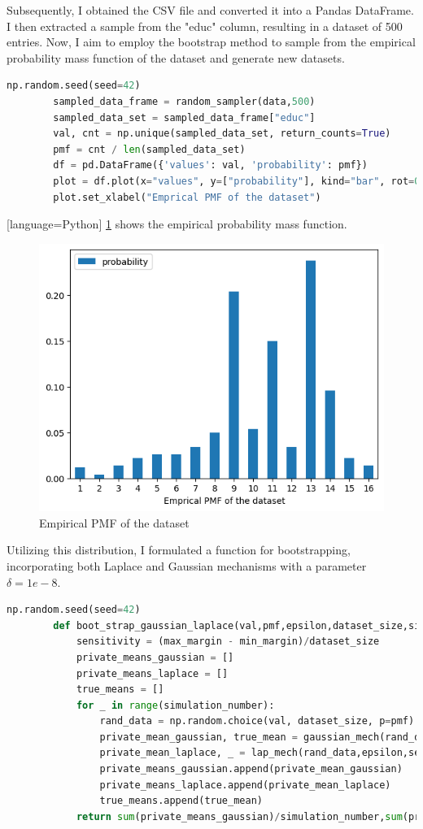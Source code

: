 \documentclass[12pt]{extarticle}
\begin{document}
	Subsequently, I obtained the CSV file and converted it into a Pandas DataFrame. I then extracted a sample from the "educ" column, resulting in a dataset of 500 entries. Now, I aim to employ the bootstrap method to sample from the empirical probability mass function of the dataset and generate new datasets.
	 \begin{lstlisting}[language=Python]	
		np.random.seed(seed=42)
		sampled_data_frame = random_sampler(data,500)
		sampled_data_set = sampled_data_frame["educ"]
		val, cnt = np.unique(sampled_data_set, return_counts=True)
		pmf = cnt / len(sampled_data_set)
		df = pd.DataFrame({'values': val, 'probability': pmf})
		plot = df.plot(x="values", y=["probability"], kind="bar", rot=0)
		plot.set_xlabel("Emprical PMF of the dataset")
	 \end{lstlisting}[language=Python]
	 \ref{fig:fig9} shows the empirical probability mass function.
	 \begin{figure}[h]
	 	\centering
	 	\includegraphics[width=1\textwidth]{im9.png}
	 	\caption{Empirical PMF of the dataset}
	 	\label{fig:fig9}
	 \end{figure}	 
	 Utilizing this distribution, I formulated a function for bootstrapping, incorporating both Laplace and Gaussian mechanisms with a parameter $\delta = 1e-8$.
	 \begin{lstlisting}[language=Python]	
	 	np.random.seed(seed=42)
	 	def boot_strap_gaussian_laplace(val,pmf,epsilon,dataset_size,simulation_number,min_margin=0,max_margin=20) :
		 	sensitivity = (max_margin - min_margin)/dataset_size
		 	private_means_gaussian = []
		 	private_means_laplace = []
		 	true_means = []
		 	for _ in range(simulation_number):
			 	rand_data = np.random.choice(val, dataset_size, p=pmf)
			 	private_mean_gaussian, true_mean = gaussian_mech(rand_data,epsilon,sensitivity,min_margin,max_margin)
			 	private_mean_laplace, _ = lap_mech(rand_data,epsilon,sensitivity,min_margin,max_margin)
			 	private_means_gaussian.append(private_mean_gaussian)
			 	private_means_laplace.append(private_mean_laplace)
			 	true_means.append(true_mean)
		 	return sum(private_means_gaussian)/simulation_number,sum(private_means_laplace)/simulation_number,sum(true_means)/simulation_number
	 \end{lstlisting}
\end{document}
